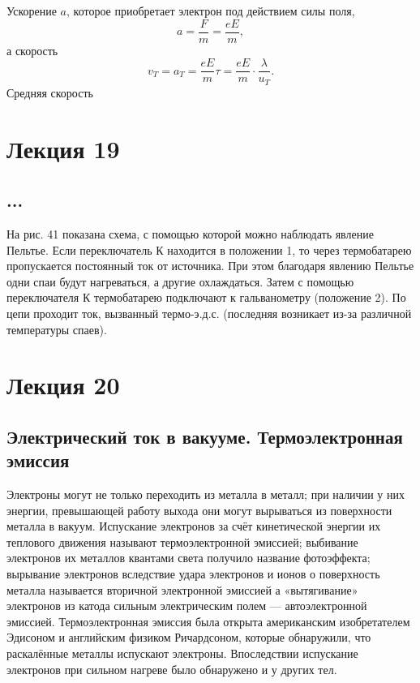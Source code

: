 \documentclass[a4paper,10pt]{book}
\begin{document}
Ускорение $a$, которое приобретает электрон под действием силы поля,
\begin{equation*}
 a = \frac{F}{m} = \frac{eE}{m},
\end{equation*}
а скорость 
\begin{equation}\label{164}
 v_T = a_T = \frac{eE}{m}\tau = \frac{eE}{m} \cdot \frac{\lambda}{u_T}.
\end{equation}
Средняя скорость



\chapter{Лекция 19}
\section*{...}
На рис. 41 показана схема, с помощью которой можно наблюдать явление Пельтье. Если переключатель К находится в положении 1, то через термобатарею пропускается постоянный ток от источника. При этом благодаря явлению Пельтье одни спаи будут нагреваться, а другие охлаждаться. Затем с помощью переключателя К термобатарею подключают к гальванометру (положение 2). По цепи проходит ток, вызванный термо-э.д.с. (последняя возникает из-за различной температуры спаев).


\chapter{Лекция 20}
\section*{Электрический ток в вакууме. Термоэлектронная эмиссия}
Электроны могут не только переходить из металла в металл; при наличии у них энергии, превышающей работу выхода они могут вырываться из поверхности металла в вакуум. Испускание электронов за счёт кинетической энергии их теплового движения называют термоэлектронной эмиссией; выбивание электронов их металлов квантами света получило название фотоэффекта; вырывание электронов вследствие удара электронов и ионов о поверхность металла называется вторичной электронной эмиссией а «вытягивание» электронов из катода сильным электрическим полем — автоэлектронной эмиссией. Термоэлектронная эмиссия была открыта американским изобретателем Эдисоном и английским физиком Ричардсоном, которые обнаружили, что раскалённые металлы испускают электроны. Впоследствии испускание электронов при сильном нагреве было обнаружено и у других тел.
\end{document}
